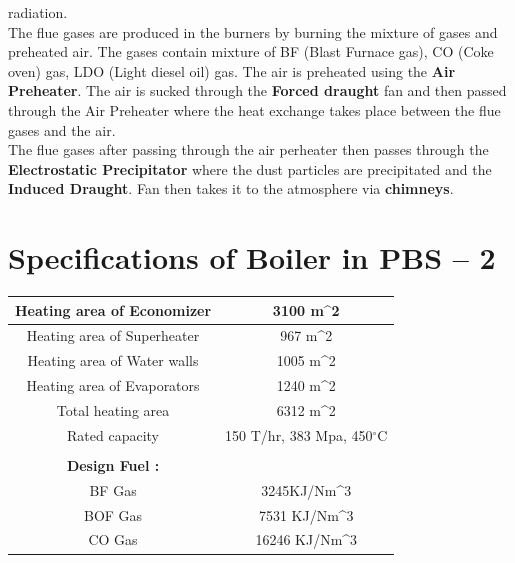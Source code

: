 \documentclass[english,11pt]{report}
\begin{document}
radiation.\\[1em]
The flue gases are produced in the burners by burning the mixture of gases and preheated air.
The gases contain mixture of BF (Blast Furnace gas), CO (Coke oven) gas, LDO (Light diesel oil)
gas. The air is preheated using the \textbf{Air Preheater}. The air is sucked through the \textbf{Forced draught} fan and then passed through the Air Preheater where the heat exchange takes place between the flue gases and the air.\\[1em]
The flue gases after passing through the air perheater then passes through the \textbf{Electrostatic Precipitator} where the dust particles are precipitated and the \textbf{Induced Draught}. Fan then takes
it to the atmosphere via \textbf{chimneys}.

\section{Specifications of Boiler in PBS – 2}
\begin{center}
\begin{tabular} { | c | c |} 
\hline
Heating area of Economizer&3100 m^2\\ \hline
Heating area of Superheater&967 m^2\\ \hline
Heating area of Water walls&1005 m^2\\ \hline
Heating area of Evaporators&1240 m^2\\ \hline
Total heating area&6312 m^2\\ \hline
Rated capacity&150 T/hr, 383 Mpa, 450$^{\circ}$C\\ \hline
&\\ \hline
\textbf{Design Fuel :}  & \\ \hline
BF Gas & 3245KJ/Nm^3 \\ \hline
BOF Gas & 7531 KJ/Nm^3 \\ \hline
CO Gas & 16246 KJ/Nm^3 \\ 
\hline
\end{tabular}
\end{center}
\end{document}

